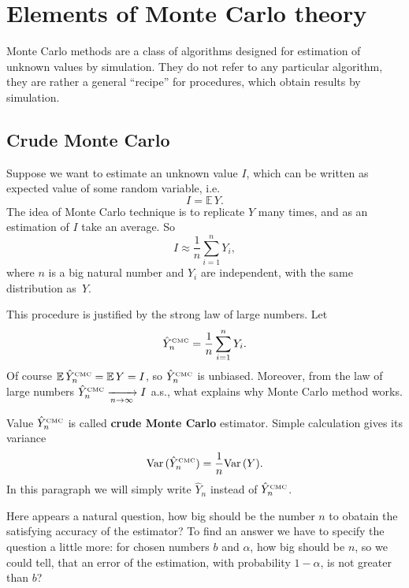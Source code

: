 \documentclass[a4paper,12pt, oneside]{book}
\theoremstyle{definition}
\theoremstyle{remark}
\def\Var{{\rm Var}\,}
\def\E{{\mathbb{E}}\,}
\def\conv{\xrightarrow[n \rightarrow \infty]{}}
\def\CMC[#1]{\hat{Y}^{\hbox{\tiny CMC}}_{#1}}
\begin{document}
\section{Elements of Monte Carlo theory}
Monte Carlo methods are a class of algorithms designed for estimation of unknown values by simulation. They do not refer to any particular algorithm, they are rather a general ``recipe'' for procedures, which obtain results by simulation.

\subsection{Crude Monte Carlo}
Suppose we want to estimate an unknown value $I$, which can be written as expected value of some random variable, i.e.
\begin{equation}
 \label{eq:EY}
 I = \E Y. 
\end{equation}
The idea of Monte Carlo technique is to replicate $Y$ many times, and as an estimation of $I$ take an average. So
\[ I \approx \frac{1}{n} \sum\limits_{i=1}^n Y_i, \]
where $n$ is a big natural number and $Y_i$ are independent, with the same distribution as~$Y$.

This procedure is justified by the strong law of large numbers. Let 
\begin{equation}
 \label{eq:CMC}
 \CMC[n] = \frac{1}{n}\sum\limits_{i=1}^n Y_i.
\end{equation}
Of course $\E\CMC[n] = \E Y = I$, so $\CMC[n]$ is unbiased. Moreover, from the law of large numbers $\CMC[n] \conv I$ a.s., what explains why Monte Carlo method works. 

Value $\CMC[n]$ is called \textbf{crude Monte Carlo} estimator. Simple calculation gives its variance
\begin{equation}
 \label{eq:VarCMC}
 \Var(\CMC[n]) = \frac{1}{n}\Var(Y).
\end{equation}
In this paragraph we will simply write $\hat{Y}_n$ instead of $\CMC[n]$.

Here appears a natural question, how big should be the number $n$ to obatain the satisfying accuracy of the estimator? To find an answer we have to specify the question a little more: for chosen numbers $b$ and $\alpha$, how big should be $n$, so we could tell, that an error of the estimation, with probability $1-\alpha$, is not greater than $b$?
\end{document}
